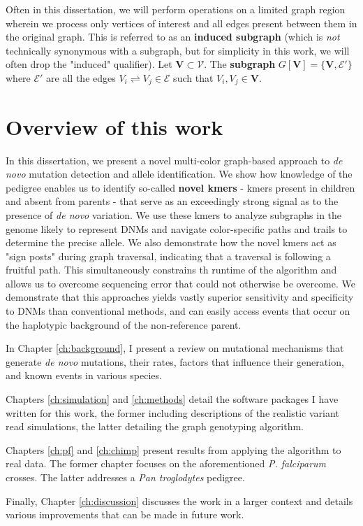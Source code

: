 Often in this dissertation, we will perform operations on a limited graph region wherein we process only vertices of interest and all edges present between them in the original graph.  This is referred to as an \textbf{induced subgraph} (which is \textit{not} technically synonymous with a subgraph, but for simplicity in this work, we will often drop the "induced" qualifier).  Let $\mathbf{V} \subset \mathcal{V}$.  The \textbf{subgraph} $G[\mathbf{V}] = \{\mathbf{V}, \mathcal{E'}\}$ where $\mathcal{E'}$ are all the edges $V_i \rightleftharpoons V_j \in \mathcal{E}$ such that $V_i, V_j \in \mathbf{V}$.

\section{Overview of this work}

In this dissertation, we present a novel multi-color graph-based approach to \textit{de novo} mutation detection and allele identification.  We show how knowledge of the pedigree enables us to identify so-called \textbf{novel kmers} - kmers present in children and absent from parents - that serve as an exceedingly strong signal as to the presence of \textit{de novo} variation.  We use these kmers to analyze subgraphs in the genome likely to represent DNMs and navigate color-specific paths and trails to determine the precise allele.  We also demonstrate how the novel kmers act as "sign posts" during graph traversal, indicating that a traversal is following a fruitful path.  This simultaneously constrains th runtime of the algorithm and allows us to overcome sequencing error that could not otherwise be overcome.  We demonstrate that this approaches yields vastly superior sensitivity and specificity to DNMs than conventional methods, and can easily access events that occur on the haplotypic background of the non-reference parent.  


In Chapter \ref{ch:background}, I present a review on mutational mechanisms that generate \textit{de novo} mutations, their rates, factors that influence their generation, and known events in various species.

Chapters \ref{ch:simulation} and \ref{ch:methods} detail the software packages I have written for this work, the former including descriptions of the realistic variant read simulations, the latter detailing the graph genotyping algorithm.

Chapters \ref{ch:pf} and \ref{ch:chimp} present results from applying the algorithm to real data.  The former chapter focuses on the aforementioned \textit{P. falciparum} crosses.  The latter addresses a \textit{Pan troglodytes} pedigree.

Finally, Chapter \ref{ch:discussion} discusses the work in a larger context and details various improvements that can be made in future work.
